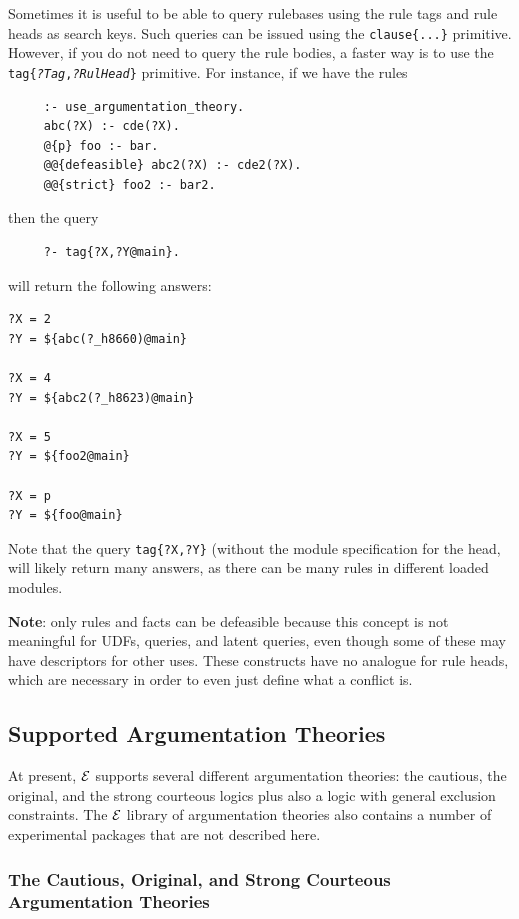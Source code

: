 \documentclass[11pt]{article}
\newcommand{\ERGO}{\mbox{\ensuremath{\cal{E}}\smaller{{\sc{RGO}}}}\xspace}
\newcommand{\FLSYSTEM}{\ERGO}
\begin{document}
Sometimes it is useful to be able to query rulebases using the rule
tags and rule heads as search keys. Such queries can be issued
using the {\tt clause\{...\}} primitive. However, 
if you do not need to query the rule bodies, a faster way is to use the
{\tt tag\{{\it?Tag},{\it ?RulHead}\}}  primitive. For instance, if we have
the rules
\begin{verbatim}
     :- use_argumentation_theory.
     abc(?X) :- cde(?X).
     @{p} foo :- bar.
     @@{defeasible} abc2(?X) :- cde2(?X).
     @@{strict} foo2 :- bar2.
\end{verbatim}
then the query
\begin{verbatim}
     ?- tag{?X,?Y@main}.
\end{verbatim}
will return the following answers:
\begin{verbatim}
?X = 2
?Y = ${abc(?_h8660)@main}

?X = 4
?Y = ${abc2(?_h8623)@main}

?X = 5
?Y = ${foo2@main}

?X = p
?Y = ${foo@main}
\end{verbatim}
Note that the query \texttt{tag\{?X,?Y\}} (without the module specification
for the head, will likely return many answers, as there can be many rules
in different loaded modules. 

\textbf{Note}: only rules and facts can be  defeasible because this concept  
is not meaningful for UDFs, queries, and latent queries, even though some of
these may have descriptors for other uses.
These constructs have no analogue for rule heads, which
are necessary in order to even just define what a conflict is.


\subsection{Supported Argumentation Theories}\label{sec-exclusion-constr}

At present, \FLSYSTEM supports several different argumentation theories: the
cautious,
the original, and the strong courteous logics plus also a
logic with general exclusion constraints. The \FLSYSTEM library of
argumentation theories also contains a number of
experimental packages that are not described here.

\subsubsection{The Cautious, Original, and Strong Courteous Argumentation Theories}
\end{document}
